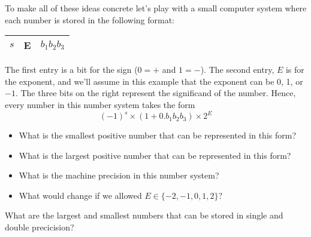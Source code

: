 \begin{problem}
    To make all of these ideas concrete let's play with a small computer system where each
    number is stored in the following format:
    \begin{center}
        \begin{tabular}{|c|c|c|}
            \hline
            $s$ & E & $b_1b_2b_3$ \\ \hline
        \end{tabular}
    \end{center}
    The first entry is a bit for the sign (0$=+$ and $1=-$). The second entry, $E$ is for the
    exponent, and we'll assume in this example that the exponent can be 0, 1, or $-1$.  The
    three bits on the right represent the significand of the number.  Hence, every number in
    this number system takes the form
    \[ (-1)^s \times (1+ 0.b_1b_2b_3) \times 2^{E} \]
    \begin{itemize}
        \item What is the smallest positive number that can be represented in this
            form?\\
        \item What is the largest positive number that can be represented in this
            form?\\
        \item What is the machine precision in this number system? \\
        \item What would change if we allowed $E \in \{-2,-1,0,1,2\}$?\\
    \end{itemize}
\end{problem}


\begin{problem}
    What are the largest and smallest numbers that can be stored in single and double
    precicision?
\end{problem}

